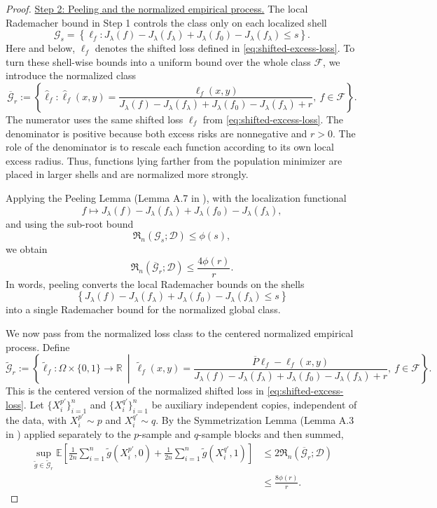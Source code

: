 \documentclass[11pt]{article}
\theoremstyle{plain}
\theoremstyle{definition}
\theoremstyle{remark}
\newcommand{\proofstep}[1]{\par\medskip\noindent\uline{#1}}
\begin{document}
\begin{proof}
\proofstep{Step 2: Peeling and the normalized empirical process.}
The local Rademacher bound in Step 1 controls the class only on each localized shell
\[
\mathcal G_s
=
\left\{
\ell_f:
J_\lambda(f)-J_\lambda(f_\lambda)
+
J_\lambda(f_0)-J_\lambda(f_\lambda)
\le s
\right\}.
\]
Here and below, \(\ell_f\) denotes the shifted loss defined in
\eqref{eq:shifted-excess-loss}.
To turn these shell-wise bounds into a uniform bound over the whole class
\(\mathcal F\), we introduce the normalized class
\[
\overline{\mathcal G}_r:=
\left\{
\widehat{\ell}_f:
\widehat{\ell}_f(x,y)
=
\frac{\ell_f(x,y)}
{J_\lambda(f)-J_\lambda(f_\lambda)
+
J_\lambda(f_0)-J_\lambda(f_\lambda)+r},
\ f\in\mathcal F
\right\}.
\]
The numerator uses the same shifted loss \(\ell_f\) from
\eqref{eq:shifted-excess-loss}.
The denominator is positive because both excess risks are nonnegative and \(r>0\).
The role of the denominator is to rescale each function according to its own
local excess radius. Thus, functions lying farther from the population
minimizer are placed in larger shells and are normalized more strongly.


Applying the Peeling Lemma (Lemma A.7 in \cite{lu2021machine}), with the
localization functional
\[
f\mapsto
J_\lambda(f)-J_\lambda(f_\lambda)
+
J_\lambda(f_0)-J_\lambda(f_\lambda),
\]
and using the sub-root bound
\[
\mathfrak R_n(\mathcal G_s;\mathcal D)\le \phi(s),
\]
we obtain
\[
\mathfrak R_n(\overline{\mathcal G}_r;\mathcal D)
\le
\frac{4\phi(r)}{r}.
\]
In words, peeling converts the local Rademacher bounds on the shells
\[
\left\{
J_\lambda(f)-J_\lambda(f_\lambda)
+
J_\lambda(f_0)-J_\lambda(f_\lambda)
\le s
\right\}
\]
into a single Rademacher bound for the normalized global class.

We now pass from the normalized loss class to the centered normalized empirical
process. Define
\[
\widetilde{\mathcal G}_r:=
\left\{
\widetilde{\ell}_f:\Omega\times\{0,1\}\to\mathbb R
\ \middle|\
\widetilde{\ell}_f(x,y)
=
\frac{\overline P\ell_f-\ell_f(x,y)}
{J_\lambda(f)-J_\lambda(f_\lambda)
+
J_\lambda(f_0)-J_\lambda(f_\lambda)+r},
\ f\in\mathcal F
\right\}.
\]
This is the centered version of the normalized shifted loss in
\eqref{eq:shifted-excess-loss}.
Let \(\{X_i^{p\prime}\}_{i=1}^n\) and
\(\{X_i^{q\prime}\}_{i=1}^n\) be auxiliary independent copies, independent of
the data, with \(X_i^{p\prime}\sim p\) and \(X_i^{q\prime}\sim q\).
By the Symmetrization Lemma (Lemma A.3 in \cite{lu2021machine})
 applied separately to the \(p\)-sample
and \(q\)-sample blocks and then summed,
\[
\begin{aligned}
\sup_{\widetilde g\in\widetilde{\mathcal G}_r}
\mathbb E
\left[
\frac1{2n}\sum_{i=1}^{n}
\widetilde g(X_i^{p\prime},0)
+
\frac1{2n}\sum_{i=1}^{n}
\widetilde g(X_i^{q\prime},1)
\right]
&\le
2\mathfrak R_n(\overline{\mathcal G}_r;\mathcal D)  \\
&\le
\frac{8\phi(r)}{r}.
\end{aligned}
\]


\end{proof}
\end{document}

